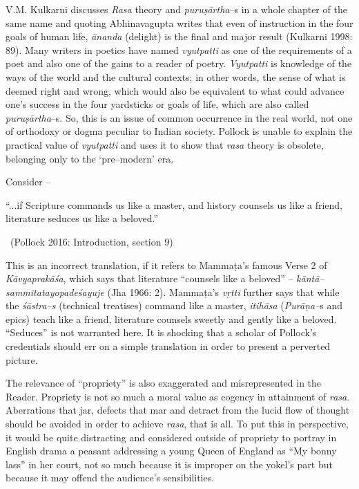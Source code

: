 V.M. Kulkarni discusses \textit{Rasa} theory and \textit{puruṣārtha}–s in a whole chapter of the same name and quoting Abhinavagupta writes that even of instruction in the four goals of human life, \textit{ānanda} (delight) is the final and major result (Kulkarni 1998: 89). Many writers in poetics have named \textit{vyutpatti} as one of the requirements of a poet and also one of the gains to a reader of poetry. \textit{Vyutpatti} is knowledge of the ways of the world and the cultural contexts; in other words, the sense of what is deemed right and wrong, which would also be equivalent to what could advance one’s success in the four yardsticks or goals of life, which are also called \textit{puruṣārtha}–s. So, this is an issue of common occurrence in the real world, not one of orthodoxy or dogma peculiar to Indian society. Pollock is unable to explain the practical value of \textit{vyutpatti }and uses it to show that \textit{rasa} theory is obsolete, belonging only to the ‘pre–modern’ era.

Consider –

\begin{myquote}
“...if Scripture commands us like a master, and history counsels us like a friend, literature seduces us like a beloved.” 

~\hfill (Pollock 2016: Introduction, section 9)
\end{myquote}

This is an incorrect translation, if it refers to Mammaṭa’s famous Verse 2 of \textit{Kāvyaprakāśa}, which says that literature “counsels like a beloved” –\textit{ kāntā–sammitatayopadeśayuje }(Jha 1966: 2). Mammaṭa’s \textit{vṛtti} further says that while the \textit{śāstra–s }(technical treatises) command like a master, \textit{itihāsa} (\textit{Purāṇa–}s and epics) teach like a friend, literature counsels sweetly and gently like a beloved. “Seduces” is not warranted here. It is shocking that a scholar of Pollock’s credentials should err on a simple translation in order to present a perverted picture.

The relevance of “propriety” is also exaggerated and misrepresented in the Reader. Propriety is not so much a moral value as cogency in attainment of \textit{rasa}. Aberrations that jar, defects that mar and detract from the lucid flow of thought should be avoided in order to achieve \textit{rasa}, that is all. To put this in perspective, it would be quite distracting and considered outside of propriety to portray in English drama a peasant addressing a young Queen of England as “My bonny lass” in her court, not so much because it is improper on the yokel’s part but because it may offend the audience’s sensibilities.

